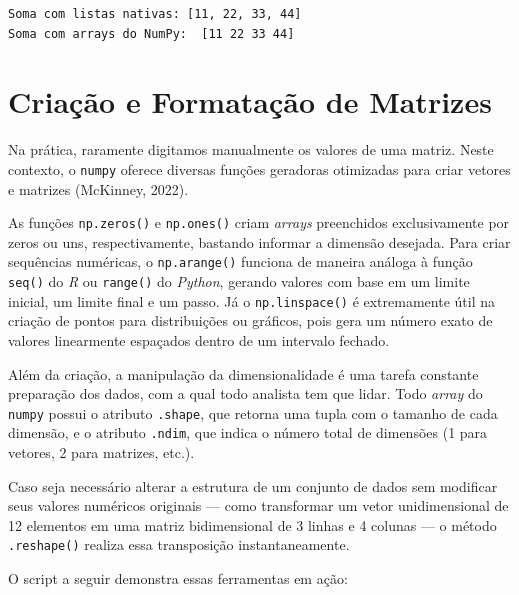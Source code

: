\documentclass[
  brazilian,
  letterpaper,
  DIV=11,
  numbers=noendperiod]{scrreprt}
\begin{document}
\begin{verbatim}
Soma com listas nativas: [11, 22, 33, 44]
Soma com arrays do NumPy:  [11 22 33 44]
\end{verbatim}

\section{Criação e Formatação de
Matrizes}\label{criauxe7uxe3o-e-formatauxe7uxe3o-de-matrizes}

Na prática, raramente digitamos manualmente os valores de uma matriz.
Neste contexto, o \texttt{numpy} oferece diversas funções geradoras
otimizadas para criar vetores e matrizes (McKinney, 2022).

As funções \texttt{np.zeros()} e \texttt{np.ones()} criam \emph{arrays}
preenchidos exclusivamente por zeros ou uns, respectivamente, bastando
informar a dimensão desejada. Para criar sequências numéricas, o
\texttt{np.arange()} funciona de maneira análoga à função \texttt{seq()}
do \emph{R} ou \texttt{range()} do \emph{Python}, gerando valores com
base em um limite inicial, um limite final e um passo. Já o
\texttt{np.linspace()} é extremamente útil na criação de pontos para
distribuições ou gráficos, pois gera um número exato de valores
linearmente espaçados dentro de um intervalo fechado.

Além da criação, a manipulação da dimensionalidade é uma tarefa
constante preparação dos dados, com a qual todo analista tem que lidar.
Todo \emph{array} do \texttt{numpy} possui o atributo \texttt{.shape},
que retorna uma tupla com o tamanho de cada dimensão, e o atributo
\texttt{.ndim}, que indica o número total de dimensões (1 para vetores,
2 para matrizes, etc.).

Caso seja necessário alterar a estrutura de um conjunto de dados sem
modificar seus valores numéricos originais --- como transformar um vetor
unidimensional de 12 elementos em uma matriz bidimensional de 3 linhas e
4 colunas --- o método \texttt{.reshape()} realiza essa transposição
instantaneamente.

O script a seguir demonstra essas ferramentas em ação:
\end{document}
